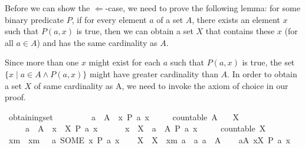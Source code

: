 \begin{isabellebody}
\isamarkupfalse%
%
\endisatagvisible
{\isafoldvisible}%
%
\isadelimvisible
%
\endisadelimvisible
%
\begin{isamarkuptext}%
Before we can show the $\Longleftarrow$-case, we need to prove the following lemma: for some binary predicate $P$, if for every element $a$ of a set $A$, there exists an element $x$ such that $P(a,x)$ is true, then we can obtain a set $X$ that contains these $x$ (for all $a \in A$) and has the same cardinality as $A$. 

Since more than one $x$ might exist for each $a$ such that $P(a,x)$ is true, the set
$\{ x \mid a \in A \wedge P(a,x) \}$
might have greater cardinality than $A$. In order to obtain a set $X$ of same cardinality as A, we need to invoke the axiom of choice in our proof.%
\end{isamarkuptext}\isamarkuptrue%
%
\isadelimvisible
%
\endisadelimvisible
%
\isatagvisible
{}\isamarkupfalse%
\ obtaining{\isacharunderscore}{\kern0pt}set{\isacharcolon}{\kern0pt}\isanewline
\ \ \ \isanewline
\ \ \ \ {\isacartoucheopen}{\isasymforall}\ a\ {\isasymin}\ A{\isachardot}{\kern0pt}\ {\isasymexists}\ x{\isachardot}{\kern0pt}\ P\ a\ x{\isacartoucheclose}\ \isanewline
\ \ \ \ {\isacartoucheopen}countable\ A{\isacartoucheclose}\isanewline
\ \ \ X\ \ \isanewline
\ \ \ \ {\isacartoucheopen}{\isasymforall}\ a\ {\isasymin}\ A{\isachardot}{\kern0pt}\ {\isasymexists}\ x\ {\isasymin}\ X{\isachardot}{\kern0pt}\ P\ a\ x{\isacartoucheclose}\ \isanewline
\ \ \ \ {\isacartoucheopen}{\isasymforall}\ x\ {\isasymin}\ X{\isachardot}{\kern0pt}\ {\isasymexists}\ a\ {\isasymin}\ A{\isachardot}{\kern0pt}\ P\ a\ x{\isacartoucheclose}\ \isanewline
\ \ \ \ {\isacartoucheopen}countable\ X{\isacartoucheclose}\isanewline
{}\isamarkupfalse%
\isanewline
\ \ %
\isanewline
\ \ \isamarkupfalse%
\ xm\ \ {\isacartoucheopen}xm\ {\isasymequiv}\ {\isasymlambda}\ a{\isachardot}{\kern0pt}\ SOME\ x{\isachardot}{\kern0pt}\ P\ a\ x{\isacartoucheclose}\isanewline
\ \ \isamarkupfalse%
\ X\ \ {\isacartoucheopen}X\ {\isasymequiv}\ {\isacharbraceleft}{\kern0pt}xm\ a\ {\isacharbar}{\kern0pt}\ a{\isachardot}{\kern0pt}\ a\ {\isasymin}\ A{\isacharbraceright}{\kern0pt}{\isacartoucheclose}\isanewline
\isanewline
\ \ \isamarkupfalse%
\ {\isacartoucheopen}{\isasymforall}a{\isasymin}A{\isachardot}{\kern0pt}\ {\isasymexists}x{\isasymin}X{\isachardot}{\kern0pt}\ P\ a\ x{\isacartoucheclose}\isanewline

\end{isabellebody}
